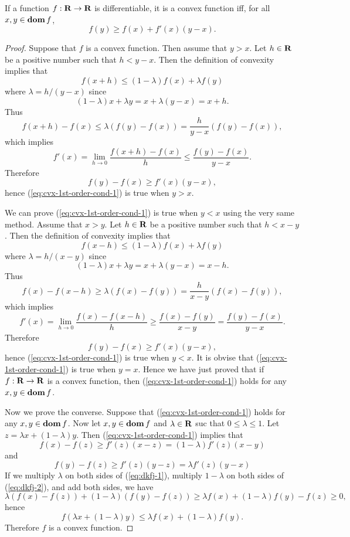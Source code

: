 \begin{theorem}
\label{theorem:cvx-1st-order-cond-1}
If a function $f:\mathbf{R}\to\mathbf{R}$ is differentiable, it is a convex function iff, for all $x, y \in \mathop{\bf dom} f$,
\begin{equation}
\label{eq:cvx-1st-order-cond-1}
        f(y) \geq f(x) + f'(x) (y-x).
\end{equation}
\end{theorem}

\begin{proof}
Suppose that $f$ is a convex function.
Then assume that $y>x$. Let $h\in\mathbf{R}$ be a positive number such that $h<y-x$. Then the definition of convexity implies that
\[
f(x+h) \leq (1-\lambda) f(x) + \lambda f(y)
\]
where $\lambda = h/(y-x)$ since
\[
(1-\lambda) x + \lambda y = x + \lambda (y-x) = x +h.
\]
Thus
\[
f(x+h) - f (x) \leq \lambda (f(y)-f(x)) = \frac{h}{y-x} (f(y)-f(x)),
\]
which implies
\[
f'(x) = \lim_{h\to0} \frac{f(x+h) - f (x)}{h} \leq \frac{f(y)-f(x)}{y-x}.
\]
Therefore
\[
f(y) - f(x) \geq f'(x)(y-x),
\]
hence (\ref{eq:cvx-1st-order-cond-1}) is true when $y>x$.

We can prove (\ref{eq:cvx-1st-order-cond-1}) is true when $y<x$ using the very same method.
Assume that $x>y$. Let $h\in\mathbf{R}$ be a positive number such that $h<x-y$. Then the definition of convexity implies that
\[
f(x-h) \leq (1-\lambda) f(x) + \lambda f(y)
\]
where $\lambda = h/(x-y)$ since
\[
(1-\lambda) x + \lambda y = x + \lambda (y-x) = x -h.
\]
Thus
\[
f(x) - f (x-h) \geq \lambda (f(x)-f(y)) = \frac{h}{x-y} (f(x)-f(y)),
\]
which implies
\[
f'(x) = \lim_{h\to0} \frac{f(x) - f (x-h)}{h} \geq \frac{f(x)-f(y)}{x-y}  =\frac{f(y)-f(x)}{y-x}.
\]
Therefore
\[
f(y) - f(x) \geq f'(x)(y-x),
\]
hence (\ref{eq:cvx-1st-order-cond-1}) is true when $y<x$.
It is obvise that (\ref{eq:cvx-1st-order-cond-1}) is true when $y=x$.
Hence we have just proved that if $f:\mathbf{R}\to\mathbf{R}$ is a convex function, then (\ref{eq:cvx-1st-order-cond-1}) holds
for any $x,y\in\mathop{\bf dom} f$.

Now we prove the converse.
Suppose that (\ref{eq:cvx-1st-order-cond-1}) holds for any $x,y\in\mathop{\bf dom} f$.
Now let $x,y\in\mathop{\bf dom} f$ and $\lambda \in \mathbf{R}$ suc that $0\leq \lambda \leq 1$.
Let $z=\lambda x + (1-\lambda) y$. Then (\ref{eq:cvx-1st-order-cond-1}) implies that
\begin{equation}
\label{eq:dkfj-1}
f(x) - f(z) \geq f'(z) (x-z) = (1-\lambda) f'(z) (x-y)
\end{equation}
and
\begin{equation}
\label{eq:dkfj-2}
f(y) - f(z) \geq f'(z) (y-z) = \lambda f'(z) (y-x)
\end{equation}
If we multiply $\lambda$ on both sides of (\ref{eq:dkfj-1}),
multiply $1-\lambda$ on both sides of (\ref{eq:dkfj-2}),
and add both sides, we have
\[
\lambda(f(x) - f(z)) + (1-\lambda) (f(y) - f(z))
\geq \lambda f(x) +(1-\lambda) f(y) - f(z) \geq 0,
\]
hence
\[
f(\lambda x + (1-\lambda) y)
\leq \lambda f(x) + (1-\lambda) f(y).
\]
Therefore $f$ is a convex function.
\end{proof}

